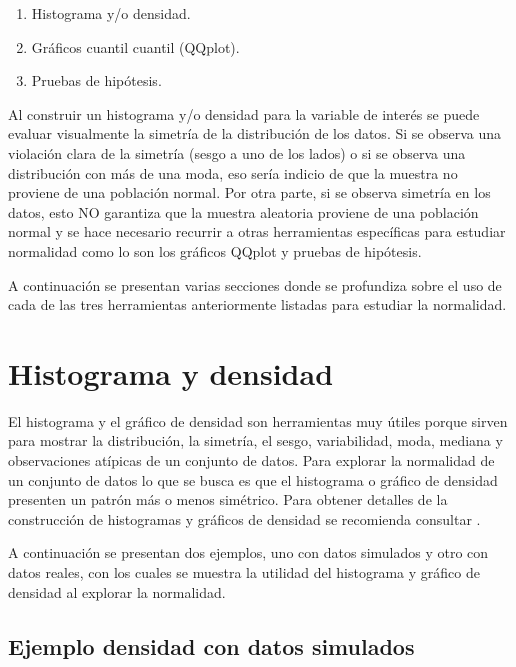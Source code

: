 \documentclass[
]{book}
\providecommand{\tightlist}{%
  \setlength{\itemsep}{0pt}\setlength{\parskip}{0pt}}
\begin{document}
\begin{enumerate}
\def\labelenumi{\arabic{enumi}.}
\tightlist
\item
  Histograma y/o densidad.
\item
  Gráficos cuantil cuantil (QQplot).
\item
  Pruebas de hipótesis.
\end{enumerate}

Al construir un histograma y/o densidad para la variable de interés se puede evaluar visualmente la simetría de la distribución de los datos. Si se observa una violación clara de la simetría (sesgo a uno de los lados) o si se observa una distribución con más de una moda, eso sería indicio de que la muestra no proviene de una población normal. Por otra parte, si se observa simetría en los datos, esto NO garantiza que la muestra aleatoria proviene de una población normal y se hace necesario recurrir a otras herramientas específicas para estudiar normalidad como lo son los gráficos QQplot y pruebas de hipótesis.

A continuación se presentan varias secciones donde se profundiza sobre el uso de cada de las tres herramientas anteriormente listadas para estudiar la normalidad.

\hypertarget{histograma-y-densidad}{%
\section{Histograma y densidad}\label{histograma-y-densidad}}

El histograma y el gráfico de densidad son herramientas muy útiles porque sirven para mostrar la distribución, la simetría, el sesgo, variabilidad, moda, mediana y observaciones atípicas de un conjunto de datos. Para explorar la normalidad de un conjunto de datos lo que se busca es que el histograma o gráfico de densidad presenten un patrón más o menos simétrico. Para obtener detalles de la construcción de histogramas y gráficos de densidad se recomienda consultar \citet{hernandez_correa}.

A continuación se presentan dos ejemplos, uno con datos simulados y otro con datos reales, con los cuales se muestra la utilidad del histograma y gráfico de densidad al explorar la normalidad.

\hypertarget{ejemplo-densidad-con-datos-simulados}{%
\subsection*{Ejemplo densidad con datos simulados}\label{ejemplo-densidad-con-datos-simulados}}
\end{document}
